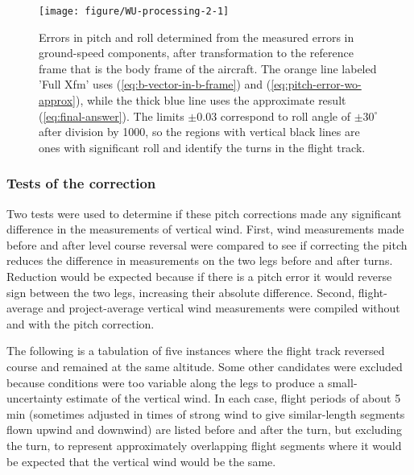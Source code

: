 \documentclass[12pt,twoside,english]{article}\usepackage[]{graphicx}\usepackage[]{color}
\newenvironment{knitrout}{}{} %
\let\OrgIndex\index
\renewcommand*{\index}[1]{\OrgIndex{#1}}
\begin{document}
\begin{knitrout}\footnotesize
{}\color{fgcolor}\begin{figure}

{\centering \texttt{[image: figure/WU-processing-2-1]} 

}

\caption[Errors in pitch and roll determined from the measured errors in ground-speed components, after transformation to the reference frame that is the body frame of the aircraft.]{Errors in pitch and roll determined from the measured errors in ground-speed components, after transformation to the reference frame that is the body frame of the aircraft. The orange line labeled 'Full Xfm' uses (\ref{eq:b-vector-in-b-frame}) and (\ref{eq:pitch-error-wo-approx}), while the thick blue line uses the approximate result (\ref{eq:final-answer}). The limits $\pm$0.03 correspond to roll angle of $\pm 30^{\circ}$ after division by 1000, so the regions with vertical black lines are ones with significant roll and identify the turns in the flight track.}\label{fig:processing-2}
\end{figure}


\end{knitrout}

\subsubsection{Tests of the correction}

Two tests were used to determine if these pitch corrections made any significant difference in the measurements of vertical wind. First, wind measurements made before and after level course reversal were compared to see if correcting the pitch reduces the difference in measurements on the two legs before and after turns. Reduction would be expected because if there is a pitch error it would reverse sign between the two legs, increasing their absolute difference. Second, flight-average and project-average vertical wind measurements were compiled without and with the pitch correction. 

The following is a tabulation of five instances where the flight track reversed course and remained at the same altitude. Some other candidates were excluded because conditions were too variable along the legs to produce a small-uncertainty estimate of the vertical wind. In each case, flight periods of about 5 min (sometimes adjusted in times of strong wind to give similar-length segments flown upwind and downwind) are listed before and after the turn, but excluding the turn, to represent approximately overlapping flight segments where it would be expected that the vertical wind would be the same. 
\end{document}
